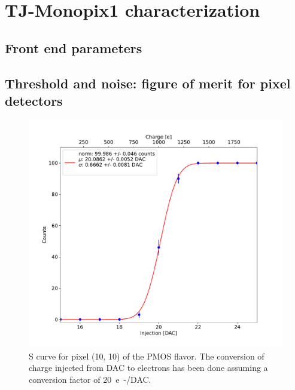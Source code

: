 
\section{TJ-Monopix1 characterization}
    \subsection{Front end parameters}


    \subsection{Threshold and noise: figure of merit for pixel detectors}
        \begin{figure}[h!]
            \centering
            \includegraphics[width=.6\linewidth]{figures/charaterization/scurve.pdf}
            \caption{S curve for pixel (10, 10) of the PMOS flavor. The conversion of charge injected from DAC to electrons has been done assuming a conversion factor of \SI{20}{e-/DAC}.}
            \label{fig:scurve}
        \end{figure}   


